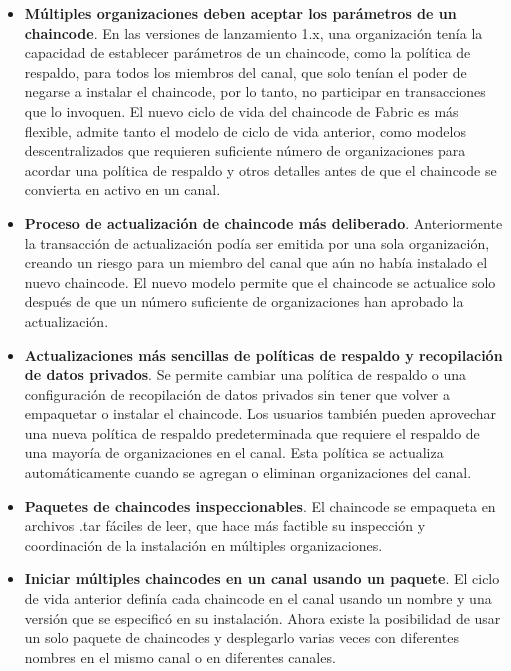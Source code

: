 {\begin{itemize}
\item {\bf M\'ultiples organizaciones deben aceptar los par\'ametros de un chaincode}. En las versiones de lanzamiento 1.x, una organizaci\'on ten\'ia la capacidad de establecer par\'ametros de un chaincode, como la pol\'itica de respaldo, para todos los miembros del canal, que solo ten\'ian el poder de negarse a instalar el chaincode, por lo tanto, no participar en transacciones que lo invoquen. El nuevo ciclo de vida del chaincode de Fabric es m\'as flexible, admite tanto el modelo de ciclo de vida anterior, como modelos descentralizados que requieren suficiente n\'umero de organizaciones para acordar una pol\'itica de respaldo y otros detalles antes de que el chaincode se convierta en activo en un canal.

\item {\bf Proceso de actualizaci\'on de chaincode m\'as deliberado}. Anteriormente la transacci\'on de actualizaci\'on pod\'ia ser emitida por una sola organizaci\'on, creando un riesgo para un miembro del canal que a\'un no hab\'ia instalado el nuevo chaincode. El nuevo modelo permite que el chaincode se actualice solo despu\'es de que un n\'umero suficiente de organizaciones han aprobado la actualizaci\'on.

\item {\bf Actualizaciones m\'as sencillas de pol\'iticas de respaldo y recopilaci\'on de datos privados}. Se permite cambiar una pol\'itica de respaldo o una configuraci\'on de recopilaci\'on de datos privados sin tener que volver a empaquetar o instalar el chaincode. Los usuarios tambi\'en pueden aprovechar una nueva pol\'itica de respaldo predeterminada que requiere el respaldo de una mayor\'ia de organizaciones en el canal. Esta pol\'itica se actualiza autom\'aticamente cuando se agregan o eliminan organizaciones del canal.

\item {\bf Paquetes de chaincodes inspeccionables}. El chaincode se empaqueta en archivos .tar f\'aciles de leer, que hace m\'as factible su inspecci\'on  y coordinaci\'on de la instalaci\'on en m\'ultiples organizaciones.

\item {\bf Iniciar m\'ultiples chaincodes en un canal usando un paquete}. El ciclo de vida anterior defin\'ia cada chaincode en el canal usando un nombre y una versi\'on que se especific\'o en su instalaci\'on. Ahora existe la posibilidad de usar un solo paquete de chaincodes y desplegarlo varias veces con diferentes nombres en el mismo canal o en diferentes canales.
\end{itemize}

}
